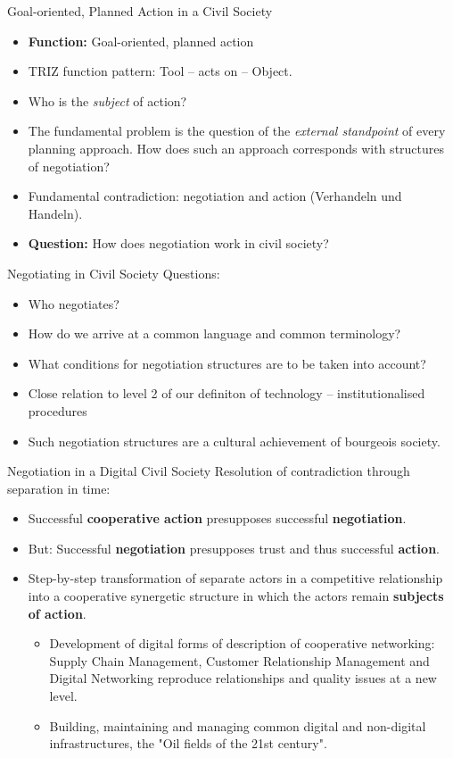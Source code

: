 \documentclass{beamer}
\begin{document}
\begin{frame}{Goal-oriented, Planned Action in a Civil Society}
\begin{itemize}
\item \textbf{Function:} Goal-oriented, planned action
\item TRIZ function pattern: Tool -- acts on -- Object.
\item Who is the \emph{subject} of action?
\item The fundamental problem is the question of the \emph{external
  standpoint} of every planning approach. How does such an approach
  corresponds with structures of negotiation?
\item Fundamental contradiction: negotiation and action (Verhandeln und
  Handeln).
\item \textbf{Question:} How does negotiation work in civil society?
\end{itemize}
\end{frame}

\begin{frame}{Negotiating in Civil Society}
Questions:
\begin{itemize}
\item Who negotiates?
\item How do we arrive at a common language and common terminology?
\item What conditions for negotiation structures are to be taken into account?
\item Close relation to level 2 of our definiton of technology --
  institutionalised procedures
\item Such negotiation structures are a cultural achievement of bourgeois
  society.
\end{itemize}
\end{frame}

\begin{frame}{Negotiation in a Digital Civil Society}
Resolution of contradiction through separation in time:
\begin{itemize}
\item Successful \textbf{cooperative action} presupposes successful
  \textbf{negotiation}.
\item But: Successful \textbf{negotiation} presupposes trust and thus
  successful \textbf{action}.
\item Step-by-step transformation of separate actors in a competitive
  relationship into a cooperative synergetic structure in which the actors
  remain \textbf{subjects of action}.
  \begin{itemize}
  \item Development of digital forms of description of cooperative networking:
    Supply Chain Management, Customer Relationship Management and Digital
    Networking reproduce relationships and quality issues at a new level.
  \item Building, maintaining and managing common digital and non-digital
    infrastructures, the "Oil fields of the 21st century".
  \end{itemize}
\end{itemize}
\end{frame}
\end{document}
